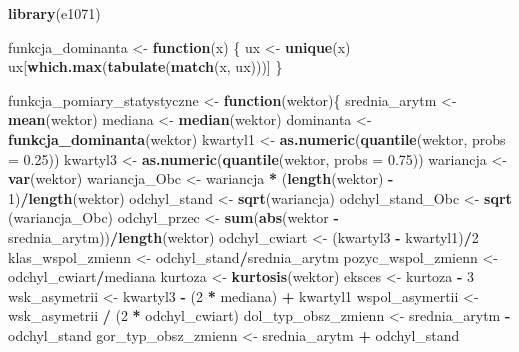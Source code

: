 \documentclass[
]{article}
\newenvironment{Shaded}{\begin{snugshade}}{\end{snugshade}}
\newcommand{\ControlFlowTok}[1]{\textcolor[rgb]{0.13,0.29,0.53}{\textbf{#1}}}
\newcommand{\DataTypeTok}[1]{\textcolor[rgb]{0.13,0.29,0.53}{#1}}
\newcommand{\DecValTok}[1]{\textcolor[rgb]{0.00,0.00,0.81}{#1}}
\newcommand{\FloatTok}[1]{\textcolor[rgb]{0.00,0.00,0.81}{#1}}
\newcommand{\KeywordTok}[1]{\textcolor[rgb]{0.13,0.29,0.53}{\textbf{#1}}}
\newcommand{\NormalTok}[1]{#1}
\newcommand{\OperatorTok}[1]{\textcolor[rgb]{0.81,0.36,0.00}{\textbf{#1}}}
\newcommand{\StringTok}[1]{\textcolor[rgb]{0.31,0.60,0.02}{#1}}
\begin{document}
\begin{Shaded}
\begin{Highlighting}[]
\KeywordTok{library}\NormalTok{(e1071)}

\NormalTok{funkcja_dominanta <-}\StringTok{ }\ControlFlowTok{function}\NormalTok{(x) \{}
\NormalTok{  ux <-}\StringTok{ }\KeywordTok{unique}\NormalTok{(x)}
\NormalTok{  ux[}\KeywordTok{which.max}\NormalTok{(}\KeywordTok{tabulate}\NormalTok{(}\KeywordTok{match}\NormalTok{(x, ux)))]}
\NormalTok{\}}

\NormalTok{funkcja_pomiary_statystyczne <-}\StringTok{ }\ControlFlowTok{function}\NormalTok{(wektor)\{}
\NormalTok{  srednia_arytm <-}\StringTok{ }\KeywordTok{mean}\NormalTok{(wektor)}
\NormalTok{  mediana <-}\StringTok{ }\KeywordTok{median}\NormalTok{(wektor)}
\NormalTok{  dominanta <-}\StringTok{ }\KeywordTok{funkcja_dominanta}\NormalTok{(wektor)}
\NormalTok{  kwartyl1 <-}\StringTok{ }\KeywordTok{as.numeric}\NormalTok{(}\KeywordTok{quantile}\NormalTok{(wektor, }\DataTypeTok{probs =} \FloatTok{0.25}\NormalTok{))}
\NormalTok{  kwartyl3 <-}\StringTok{ }\KeywordTok{as.numeric}\NormalTok{(}\KeywordTok{quantile}\NormalTok{(wektor, }\DataTypeTok{probs =} \FloatTok{0.75}\NormalTok{))}
\NormalTok{  wariancja <-}\StringTok{ }\KeywordTok{var}\NormalTok{(wektor)}
\NormalTok{  wariancja_Obc <-}\StringTok{ }\NormalTok{wariancja }\OperatorTok{*}\StringTok{ }\NormalTok{(}\KeywordTok{length}\NormalTok{(wektor) }\OperatorTok{-}\StringTok{ }\DecValTok{1}\NormalTok{)}\OperatorTok{/}\KeywordTok{length}\NormalTok{(wektor)}
\NormalTok{  odchyl_stand <-}\StringTok{ }\KeywordTok{sqrt}\NormalTok{(wariancja)}
\NormalTok{  odchyl_stand_Obc <-}\StringTok{ }\KeywordTok{sqrt}\NormalTok{ (wariancja_Obc)}
\NormalTok{  odchyl_przec <-}\StringTok{ }\KeywordTok{sum}\NormalTok{(}\KeywordTok{abs}\NormalTok{(wektor }\OperatorTok{-}\StringTok{ }\NormalTok{srednia_arytm))}\OperatorTok{/}\KeywordTok{length}\NormalTok{(wektor)}
\NormalTok{  odchyl_cwiart <-}\StringTok{ }\NormalTok{(kwartyl3 }\OperatorTok{-}\StringTok{ }\NormalTok{kwartyl1)}\OperatorTok{/}\DecValTok{2}
\NormalTok{  klas_wspol_zmienn <-}\StringTok{ }\NormalTok{odchyl_stand}\OperatorTok{/}\NormalTok{srednia_arytm}
\NormalTok{  pozyc_wspol_zmienn <-}\StringTok{ }\NormalTok{odchyl_cwiart}\OperatorTok{/}\NormalTok{mediana}
\NormalTok{  kurtoza <-}\StringTok{ }\KeywordTok{kurtosis}\NormalTok{(wektor)}
\NormalTok{  eksces <-}\StringTok{ }\NormalTok{kurtoza }\OperatorTok{-}\StringTok{ }\DecValTok{3}
\NormalTok{  wsk_asymetrii <-}\StringTok{ }\NormalTok{kwartyl3 }\OperatorTok{-}\StringTok{ }\NormalTok{(}\DecValTok{2} \OperatorTok{*}\StringTok{ }\NormalTok{mediana) }\OperatorTok{+}\StringTok{ }\NormalTok{kwartyl1}
\NormalTok{  wspol_asymertii <-}\StringTok{ }\NormalTok{wsk_asymetrii }\OperatorTok{/}\StringTok{ }\NormalTok{(}\DecValTok{2} \OperatorTok{*}\StringTok{ }\NormalTok{odchyl_cwiart)}
\NormalTok{  dol_typ_obsz_zmienn <-}\StringTok{ }\NormalTok{srednia_arytm }\OperatorTok{-}\StringTok{ }\NormalTok{odchyl_stand}
\NormalTok{  gor_typ_obsz_zmienn <-}\StringTok{ }\NormalTok{srednia_arytm }\OperatorTok{+}\StringTok{ }\NormalTok{odchyl_stand}
  

\end{Highlighting}
\end{Shaded}
\end{document}

